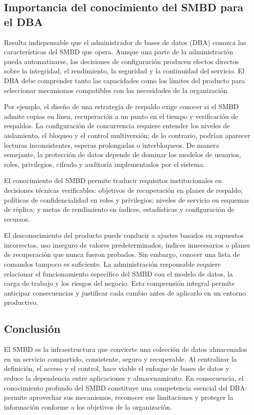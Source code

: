 \subsection*{Importancia del conocimiento del SMBD para el DBA}

Resulta indispensable que el administrador de bases de datos (DBA) conozca las
características del SMBD que opera. Aunque una parte de la administración pueda
automatizarse, las decisiones de configuración producen efectos directos sobre
la integridad, el rendimiento, la seguridad y la continuidad del servicio. El
DBA debe comprender tanto las capacidades como los límites del producto para
seleccionar mecanismos compatibles con las necesidades de la organización.

Por ejemplo, el diseño de una estrategia de respaldo exige conocer si el SMBD
admite copias en línea, recuperación a un punto en el tiempo y verificación de
respaldos. La configuración de concurrencia requiere entender los niveles de
aislamiento, el bloqueo y el control multiversión; de lo contrario, podrían
aparecer lecturas inconsistentes, esperas prolongadas o interbloqueos. De manera
semejante, la protección de datos depende de dominar los modelos de usuarios,
roles, privilegios, cifrado y auditoría implementados por el sistema.

\begin{tcolorbox}[
  colback=softblue,
  colframe=unamblue,
  title=Criterio profesional del DBA,
  fonttitle=\bfseries
]
El conocimiento del SMBD permite traducir requisitos institucionales en
decisiones técnicas verificables: objetivos de recuperación en planes de
respaldo; políticas de confidencialidad en roles y privilegios; niveles de
servicio en esquemas de réplica; y metas de rendimiento en índices, estadísticas
y configuración de recursos.
\end{tcolorbox}

El desconocimiento del producto puede conducir a ajustes basados en supuestos
incorrectos, uso inseguro de valores predeterminados, índices innecesarios o
planes de recuperación que nunca fueron probados. Sin embargo, conocer una lista
de comandos tampoco es suficiente. La administración responsable requiere
relacionar el funcionamiento específico del SMBD con el modelo de datos, la
carga de trabajo y los riesgos del negocio. Esta comprensión integral permite
anticipar consecuencias y justificar cada cambio antes de aplicarlo en un
entorno productivo.

\subsection*{Conclusión}

El SMBD es la infraestructura que convierte una colección de datos almacenados
en un servicio compartido, consistente, seguro y recuperable. Al centralizar la
definición, el acceso y el control, hace viable el enfoque de bases de datos y
reduce la dependencia entre aplicaciones y almacenamiento. En consecuencia, el
conocimiento profundo del SMBD constituye una competencia esencial del DBA:
permite aprovechar sus mecanismos, reconocer sus limitaciones y proteger la
información conforme a los objetivos de la organización.
